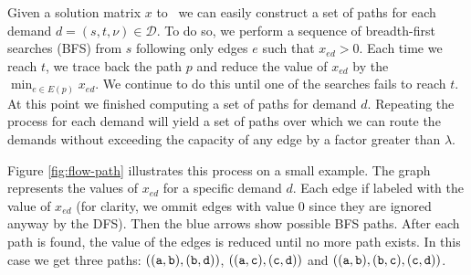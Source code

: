 Given a solution matrix $x$ to \mcflp~we can easily construct a set of paths for each demand $d = (s, t, \nu) \in \mathcal{D}$.
To do so, we perform a sequence of breadth-first searches (BFS) from $s$ following only edges $e$ such that $x_{ed} > 0$. Each time we reach $t$, we 
trace back the path $p$ and reduce the value of $x_{ed}$ by the $\min_{e \in E(p)} x_{ed}$. We continue to do this until one of the searches
fails to reach $t$. At this point we finished computing a set of paths for demand $d$. Repeating the process for each demand will yield a set of 
paths over which we can route the demands without exceeding the capacity of any edge by a factor greater than $\lambda$. 

Figure \ref{fig:flow-path} illustrates this process on a small example. The graph represents the values of $x_{ed}$ for a specific demand $d$. Each edge
if labeled with the value of $x_{ed}$ (for clarity, we ommit edges with value $0$ since they are ignored anyway by the DFS). Then the blue arrows show possible
BFS paths. After each path is found, the value of the edges is reduced until no more path exists. In this case we get three paths: 
$((\texttt{a}, \texttt{b}), (\texttt{b}, \texttt{d}))$, $((\texttt{a}, \texttt{c}), (\texttt{c}, \texttt{d}))$ and $((\texttt{a}, \texttt{b}), (\texttt{b}, \texttt{c}), (\texttt{c}, \texttt{d}))$.

